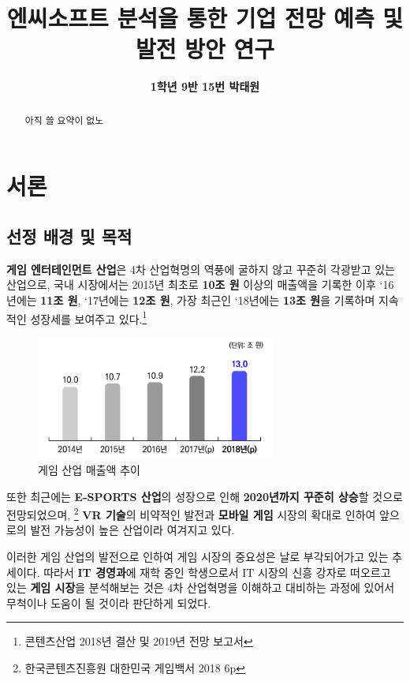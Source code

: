 \documentclass[11pt]{oblivoir}
\title{\textbf{엔씨소프트 분석을 통한 기업 전망 예측 및 발전 방안 연구}}
\author{\textbf{1학년 9반 15번 박태원}}
\begin{document}
	\begin{center}
		\maketitle
		\begin{abstract}
			아직 쓸 요약이 없노
		\end{abstract}
		\tableofcontents
		\pagebreak
	\end{center}
	
	
	\section{서론}
		\subsection{선정 배경 및 목적}
			\textbf{게임 엔터테인먼트 산업}은 4차 산업혁명의 역풍에 굴하지 않고 꾸준히 각광받고 있는 산업으로, 국내 시장에서는 2015년 최초로 \textbf{10조 원} 이상의 매출액을 기록한 이후 `16년에는 \textbf{11조 원}, `17년에는 \textbf{12조 원}, 가장 최근인 `18년에는 \textbf{13조 원}을 기록하며 지속적인 성장세를 보여주고 있다.\footnote{콘텐츠산업 2018년 결산 및 2019년 전망 보고서}
			
			\begin{figure}[htbp]
				\centering
				\includegraphics[width=0.7\textwidth]{Pictures/GameMaechul.png}
				\caption{게임 산업 매출액 추이}
			\end{figure}
			
			또한 최근에는 \textbf{E-SPORTS 산업}의 성장으로 인해 \textbf{2020년까지 꾸준히 상승}할 것으로 전망되었으며, \footnote{한국콘텐츠진흥원 대한민국 게임백서 2018 6p} 
			\textbf{VR 기술}의 비약적인 발전과 \textbf{모바일 게임} 시장의 확대로 인하여 앞으로의 발전 가능성이 높은 산업이라 여겨지고 있다.
			
			이러한 게임 산업의 발전으로 인하여 게임 시장의 중요성은 날로 부각되어가고 있는 추세이다. 따라서 \textbf{IT 경영과}에 재학 중인 학생으로서 IT 시장의 신흥 강자로 떠오르고 있는 \textbf{게임 시장}을 분석해보는 것은 4차 산업혁명을 이해하고 대비하는 과정에 있어서 무척이나 도움이 될 것이라 판단하게 되었다.
			
\end{document}
